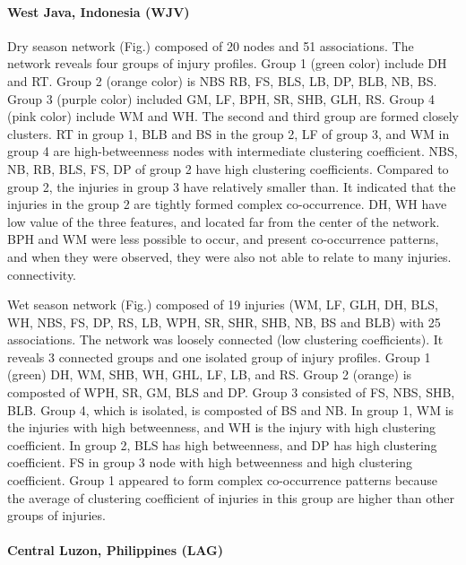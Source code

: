 \paragraph{West Java, Indonesia (WJV)}
 
Dry season network (Fig.) composed of 20 nodes and 51 associations. The network reveals four groups of injury profiles. Group 1 (green color) include DH and RT. Group 2 (orange color) is NBS RB, FS, BLS, LB, DP, BLB, NB, BS. Group 3 (purple color) included GM, LF, BPH, SR, SHB, GLH, RS. Group 4 (pink color) include WM and WH.  The second and third group are formed closely clusters.  RT in group 1, BLB and BS in the group 2, LF of group 3, and WM in group 4 are high-betweenness nodes with intermediate clustering coefficient.  NBS, NB, RB, BLS, FS, DP of group 2 have high clustering coefficients. Compared to group 2, the injuries in group 3 have relatively smaller than. It indicated that the injuries in the group 2 are tightly formed complex co-occurrence.  DH, WH have low value of the three features, and located far from the center of the network. BPH and WM were less possible to occur, and present co-occurrence patterns, and when they were observed, they were also not able to relate to many injuries. connectivity.

Wet season network (Fig.) composed of 19 injuries (WM, LF, GLH, DH, BLS, WH, NBS, FS, DP, RS, LB, WPH, SR, SHR, SHB, NB, BS and BLB) with 25 associations. The network was loosely connected (low clustering coefficients). It reveals 3 connected groups and one isolated group of injury profiles. Group 1 (green) DH, WM, SHB, WH, GHL, LF, LB, and RS. Group 2 (orange) is composted of WPH, SR, GM, BLS and DP. Group 3 consisted of FS, NBS, SHB, BLB. Group 4, which is isolated, is composted of BS and NB. In group 1, WM is the injuries with high betweenness, and WH is the injury with high clustering coefficient. In group 2, BLS has high betweenness, and DP has high clustering coefficient. FS in group 3 node with high betweenness and high clustering coefficient. Group 1 appeared to form complex co-occurrence patterns because the average of clustering coefficient of injuries in this group are higher than other groups of injuries.  

\paragraph{Central Luzon, Philippines (LAG)}

